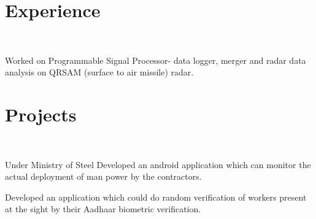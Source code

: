 \documentclass[a4paper]{manish-resume} %
\begin{document}
\begin{minipage}[t]{0.66\textwidth} %


\section{Experience}

\\

\vspace{\topsep} %
\begin{tightitemize}
\item Worked on Programmable Signal Processor- data logger, merger and radar data analysis on QRSAM (surface to air missile) radar.

\end{tightitemize}

\sectionspace %

\section{Projects}

\\

\begin{tightitemize}
\item Under Ministry of Steel Developed an android application which can monitor the actual deployment of man power by the contractors. 
\item Developed an application which could do random verification of workers present at the sight by their Aadhaar biometric verification.

\end{tightitemize}
\sectionspace
{}\\


\end{minipage}
\end{document}
